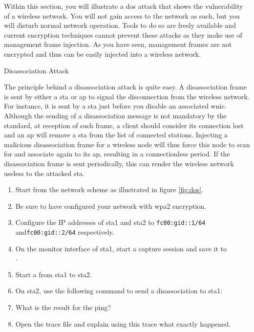 Within this section, you will illustrate a \ac{dos} attack that shows the vulnerability of a wireless network. You will not gain access to the network as such, but you will disturb normal network operation. Tools to do so are freely available and current encryption techniques cannot prevent these attacks as they make use of management frame injection. As you have seen, management frames are not encrypted and thus can be easily injected into a wireless network. 

\begin{exercise}{Disassociation Attack}
	
	The principle behind a disassociation attack is quite easy. A disassociation frame is sent by either a \ac{sta} or \ac{ap} to signal the disconnection from the wireless network. For instance, it is sent by a \ac{sta} just before you disable an associated \ac{wnic}. Although the sending of a disassociation message is not mandatory by the standard, at reception of such frame, a client should consider its connection lost and an \ac{ap} will remove a \ac{sta} from the list of connected stations. Injecting a malicious disassociation frame for a wireless node will thus force this node to scan for and associate again to its \ac{ap}, resulting in a connectionless period. If the disassociation frame is sent periodically, this can render the wireless network useless to the attacked \ac{sta}.

\begin{enumerate}
	\item Start from the network scheme as illustrated in figure \ref{fig:dos}.
	\item Be sure to have configured your network with \ac{wpa}2 encryption.
	\item Configure the IP addresses of \ac{sta}1 and \ac{sta}2  to \texttt{fc00:\acs{gid}::1/64} and\newline \texttt{fc00:\acs{gid}::2/64} respectively.
	\item On the monitor interface of \ac{sta}1, start a capture session and save it to\newline {}\\.
	\item Start a  from \ac{sta}1 to \ac{sta}2.
	\item On \ac{sta}2, use the following command to send a disassociation to \ac{sta}1:\newline
	\item What is the result for the ping?\newline
	\begin{esolution}
	\end{esolution}
	\item Open the trace file and explain using this trace what exactly happened.\newline
	\begin{esolution}
	\end{esolution}

\end{enumerate} 	
	
\end{exercise}
